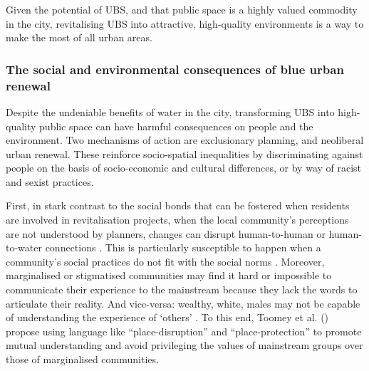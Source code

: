 \documentclass{article}
\begin{document}
Given the potential of UBS, and that public space is a highly valued commodity in the city, revitalising UBS into attractive, high-quality environments is a way to make the most of all urban areas.
 
\subsubsection{The social and environmental consequences of blue urban renewal}

Despite the undeniable benefits of water in the city, transforming UBS into high-quality public space can have harmful consequences on people and the environment.
Two mechanisms of action are exclusionary planning, and neoliberal urban renewal. These reinforce socio-spatial inequalities by discriminating against people on the basis of socio-economic and cultural differences, or by way of racist and sexist practices.

First, in stark contrast to the social bonds that can be fostered when residents are involved in revitalisation projects, when the local community’s perceptions are not understood by planners, changes can disrupt human-to-human or human-to-water connections \parencite{toomey2021place}. This is particularly susceptible to happen when a community's social practices do not fit with the social norms \parencite{wessells2014urban}. 
Moreover, marginalised or stigmatised communities may find it hard or impossible to communicate their experience to the mainstream because they lack the words to articulate their reality. And vice-versa: wealthy, white, males may not be capable of understanding the experience of `others' \parencite{anguelovski2020expanding}. To this end, Toomey et al. (\citeyear{toomey2021place}) propose using language like ``place-disruption'' and ``place-protection'' to promote mutual understanding and avoid privileging the values of mainstream groups over those of marginalised communities.
\end{document}
